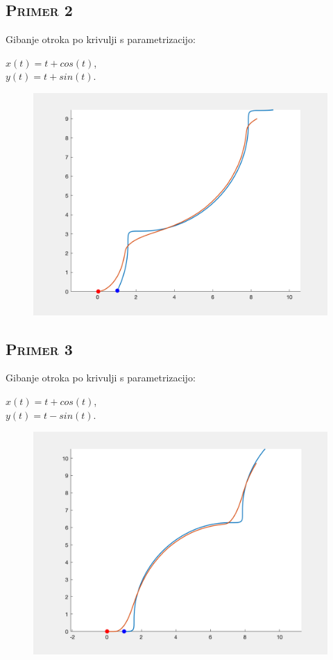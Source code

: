 \documentclass[a4paper,12pt]{article}
\begin{document}
    \subsection{\textsc{Primer 2}}
     Gibanje otroka po krivulji s parametrizacijo:
    \begin{center}
    $x(t) = t + cos(t)$, \\
    $y(t) = t + sin(t)$. 
    \end{center}      
    \begin{figure}[!h]
        \centering
        \includegraphics[scale=0.4]{Primer2}
    \end{figure}

    \subsection{\textsc{Primer 3}}
    Gibanje otroka po krivulji s parametrizacijo:
    \begin{center}
    $x(t) = t + cos(t)$, \\
    $y(t) = t - sin(t)$. 
    \end{center}      
    \begin{figure}[!h]
        \centering
        \includegraphics[scale=0.4]{Primer3}
    \end{figure}
    
\end{document}
